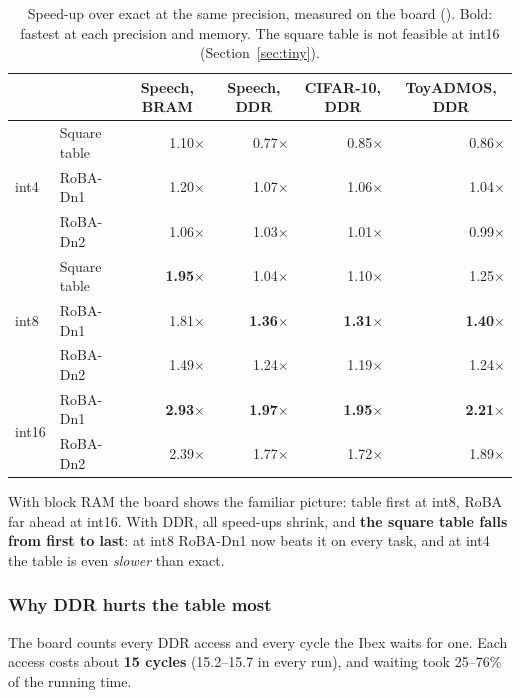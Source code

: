 \begin{table}[H]
\centering
\small
\begin{tabular}{llrrrr}
\toprule
 & & \multicolumn{1}{c}{Speech, BRAM} & \multicolumn{1}{c}{Speech, DDR} & \multicolumn{1}{c}{CIFAR-10, DDR}
 & \multicolumn{1}{c}{ToyADMOS, DDR}\\
\midrule
\multirow{3}{*}{int4} & Square table & 1.10$\times$ & 0.77$\times$ & 0.85$\times$ & 0.86$\times$\\
 & RoBA-Dn1 & 1.20$\times$ & 1.07$\times$ & 1.06$\times$ & 1.04$\times$\\
 & RoBA-Dn2 & 1.06$\times$ & 1.03$\times$ & 1.01$\times$ & 0.99$\times$\\
\midrule
\multirow{3}{*}{int8} & Square table & \textbf{1.95$\times$} & 1.04$\times$ & 1.10$\times$ & 1.25$\times$\\
 & RoBA-Dn1 & 1.81$\times$ & \textbf{1.36$\times$} & \textbf{1.31$\times$} & \textbf{1.40$\times$}\\
 & RoBA-Dn2 & 1.49$\times$ & 1.24$\times$ & 1.19$\times$ & 1.24$\times$\\
\midrule
\multirow{2}{*}{int16} & RoBA-Dn1 & \textbf{2.93$\times$} & \textbf{1.97$\times$} & \textbf{1.95$\times$} & \textbf{2.21$\times$}\\
 & RoBA-Dn2 & 2.39$\times$ & 1.77$\times$ & 1.72$\times$ & 1.89$\times$\\
\bottomrule
\end{tabular}
\caption{Speed-up over exact at the same precision, measured on the board
(). Bold: fastest at each precision and memory. The square table
is not feasible at int16 (Section~\ref{sec:tiny}).}
\label{tab:board}
\end{table}

With block RAM the board shows the familiar picture: table first at int8, RoBA far ahead at int16. With DDR,
all speed-ups shrink, and \textbf{the square table falls from first to last}: at int8 RoBA-Dn1 now beats it on
every task, and at int4 the table is even \emph{slower} than exact.

\subsubsection*{Why DDR hurts the table most}

The board counts every DDR access and every cycle the Ibex waits for one. Each access costs about
\textbf{15 cycles} (15.2--15.7 in every run), and waiting took 25--76\% of the running time.

